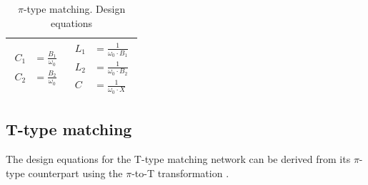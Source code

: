 \begin{table}[H]
\begin{tabular}{ | c | c | }
\begin{minipage}{.4\textwidth}
{\begin{align}
           C_1 &= \frac{B_1}{\omega_0}\\
           C_2 &= \frac{B_2}{\omega_0}
         \end{align}}
    \end{minipage}
    &
        \begin{minipage}{.4\textwidth}
         {\begin{align}
           L_1 &= \frac{1}{\omega_0 \cdot B_1}\\
           L_2 &= \frac{1}{\omega_0 \cdot B_2}\\
           C   &= \frac{1}{\omega_0 \cdot X}
         \end{align}}
    \end{minipage}
    \\ \hline
  \end{tabular}
  \caption{$\pi$-type matching. Design equations}
  \label{tbl:pi-type-matching}
\end{table}

\subsection{T-type matching}

\noindent The design equations for the T-type matching network can be derived from its $\pi$-type counterpart using the $\pi$-to-T transformation \cite{ElectricalCommunicationAAlbert}.

